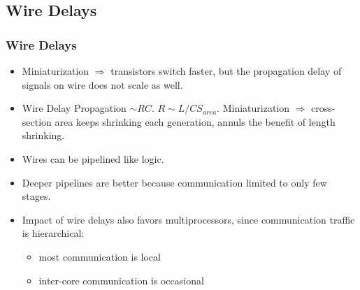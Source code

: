 \documentclass{beamer}
\renewcommand{\emph}[1]{\textcolor{structure}{#1}}
\begin{document}
\subsection{Wire Delays}
\begin{frame}[fragile,t]
\frametitle{Wire Delays}

\begin{itemize}
    \item Miniaturization $\Rightarrow$ transistors switch faster,
            but the propagation delay of signals on wire does not 
            scale as well.\medskip

    \item Wire Delay Propagation $\sim R C$. $R \sim L / CS_{area}$.
            Miniaturization $\Rightarrow$ cross-section area keeps shrinking
                each generation, annuls the benefit of length shrinking. \medskip

    \item Wires can be pipelined like logic.\medskip

    \item Deeper pipelines are better because communication
            limited to only few stages.\medskip

    \item \emph{Impact of wire delays also favors multiprocessors,
            since communication traffic is hierarchical:}
            \begin{itemize}
                \item most communication is local 
                \item inter-core communication is occasional
            \end  {itemize}

\end  {itemize}
\end{frame}
\end{document}
